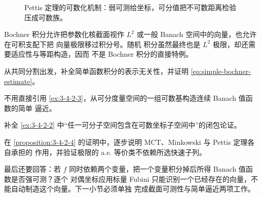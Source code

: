 \begin{figure}[htbp]
\centering
{}
\caption{Pettis 定理的可数化机制：弱可测给坐标，可分值把不可数距离检验压成可数族。}
\label{fig:3-4-2-pettis}
\end{figure}

Bochner 积分允许把参数化核截面视作 $L^2$ 或一般 Banach 空间中的向量，也允许在可积支配下把
向量极限移过积分号。随机 \Ito{} 积分虽然最终也是 $L^2$ 极限，却还需要适应性与等距构造，因而
不是 Bochner 积分的直接特例。

\begin{exercise}[简单向量积分]\label{exercise:3-4-2-1}
从共同分割出发，补全简单函数积分的表示无关性，并证明
\eqref{eq:simple-bochner-estimate}。
\end{exercise}
\begin{exercise}[连续映射]\label{exercise:3-4-2-2}
不用直接引用 \cref{ex:3-4-2-3}，从可分度量空间的一组可数基构造连续 Banach 值函数的简单
逼近。
\end{exercise}
\begin{exercise}[不可分值反例]\label{exercise:3-4-2-3}
补全 \cref{ex:3-4-2-2} 中“任一可分子空间包含在可数坐标子空间中”的闭包论证。
\end{exercise}
\begin{exercise}[Banach 值 $L^p$]\label{exercise:3-4-2-4}
在 \cref{proposition:3-4-2-4} 的证明中，逐步说明 MCT、Minkowski 与 Pettis 定理各自承担的
作用，并验证极限的 a.e. 等价类不依赖所选快速子列。
\end{exercise}

最后还要回答：若 $f$ 同时依赖两个变量，把一个变量积分掉后所得 Banach 值函数是否强可测？逐个
对偶坐标应用标量 Fubini 只能识别一个已经存在的向量，不能自动制造这个向量。下一小节必须单独
完成截面可测性与简单逼近两项工作。


